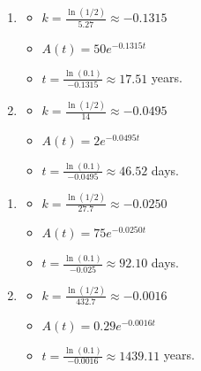 \begin{multicols}{2}
\begin{enumerate}
\setcounter{enumi}{\value{HW}}
\addtocounter{enumi}{1}

\item  \begin{itemize}  \item $k = \frac{\ln(1/2)}{5.27} \approx -0.1315$

\item $A(t) = 50e^{-0.1315t}$

\item  $t = \frac{\ln(0.1)}{-0.1315} \approx 17.51$ years.

\end{itemize}



\item  \begin{itemize}  \item $k = \frac{\ln(1/2)}{14} \approx -0.0495$

\item $A(t) = 2e^{-0.0495t}$

\item  $t = \frac{\ln(0.1)}{-0.0495} \approx 46.52$ days.

\end{itemize}

\setcounter{HW}{\value{enumi}}
\end{enumerate}
\end{multicols}

\begin{multicols}{2}
\begin{enumerate}
\setcounter{enumi}{\value{HW}}


\item  \begin{itemize}  \item $k = \frac{\ln(1/2)}{27.7} \approx -0.0250$

\item $A(t) = 75e^{-0.0250t}$

\item  $t = \frac{\ln(0.1)}{-0.025} \approx 92.10$ days.

\end{itemize}

\item  \begin{itemize}  \item $k = \frac{\ln(1/2)}{432.7} \approx -0.0016$

\item $A(t) = 0.29e^{-0.0016t}$

\item  $t = \frac{\ln(0.1)}{-0.0016} \approx 1439.11$ years.

\end{itemize}


\setcounter{HW}{\value{enumi}}
\end{enumerate}
\end{multicols}

